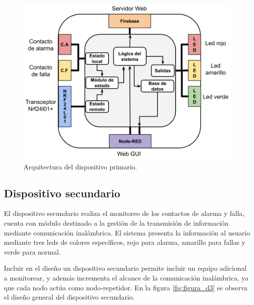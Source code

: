 \begin{figure}[]
	\centering
	\includegraphics[scale=.25]{./Figures/Capitulo3/Fig_C3.png}
	\caption{Arquitectura del dispositivo primario.}
	\label{fig:figura_c3}
\end{figure}

\subsection{Dispositivo secundario}

El dispositivo secundario realiza el  monitoreo de los contactos de alarma y falla, cuenta con módulo destinado a la gestión de la transmisión de información mediante comunicación inalámbrica. El sistema presenta la información al usuario mediante tres leds de colores específicos, rojo para alarma, amarillo para fallas y verde para normal.


Incluir en el diseño un dispositivo secundario permite incluir un equipo adicional a monitorear, y además incrementa el alcance de la comunicación inalámbrica, ya que cada nodo actúa como nodo-repetidor. En la figura \ref{fig:figura_d3} se observa el diseño general del dispositivo secundario.


